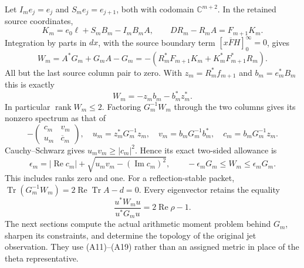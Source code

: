 Let \(I_me_j=e_j\) and \(S_me_j=e_{j+1}\), both with codomain
\(\mathbb{C}^{m+2}\). In the retained source coordinates,
\[
 K_m=e_0\ell+S_mB_m-I_mB_mA,\qquad
 DR_m-R_mA=F_{m+1}K_m .
 \tag{A16}
\]
Integration by parts in \(dx\), with the source boundary term
\([x\overline FH]_0^\infty=0\), gives
\[
 W_m=A^*G_m+G_mA-G_m
       =-(R_m^*F_{m+1}K_m+K_m^*F_{m+1}^*R_m).
\]
All but the last source column pair to zero.
With \(z_m=R_m^*f_{m+1}\) and \(b_m=e_m^*B_m\) this is exactly
\[
                   W_m=-z_mb_m-b_m^*z_m^* .
 \tag{A17}
\]
In particular \(\operatorname{rank}W_m\leq2\).
Factoring \(G_m^{-1}W_m\) through the two columns gives its nonzero
spectrum as that of
\[
 -\begin{pmatrix}c_m&v_m\\u_m&\overline c_m\end{pmatrix},\quad
 u_m=z_m^*G_m^{-1}z_m,\quad v_m=b_mG_m^{-1}b_m^*,\quad
 c_m=b_mG_m^{-1}z_m.
\]
Cauchy--Schwarz gives \(u_mv_m\geq|c_m|^2\).
Hence its exact two-sided allowance is
\[
 \epsilon_m=|\operatorname{Re}c_m|+
            \sqrt{u_mv_m-(\operatorname{Im}c_m)^2},\qquad
 -\epsilon_mG_m\leq W_m\leq\epsilon_mG_m .
 \tag{A18}
\]
This includes ranks zero and one.
For a reflection-stable packet,
\(\operatorname{Tr}(G_m^{-1}W_m)
=2\operatorname{Re}\operatorname{Tr}A-d=0\).
Every eigenvector retains the equality
\[
        \frac{u^*W_mu}{u^*G_mu}=2\operatorname{Re}\rho-1 .
 \tag{A19}
\]
The next sections compute the actual arithmetic moment problem
behind \(G_m\), sharpen its constraints, and determine the topology
of the original jet observation. They use (A11)--(A19) rather than
an assigned metric in place of the theta representative.


